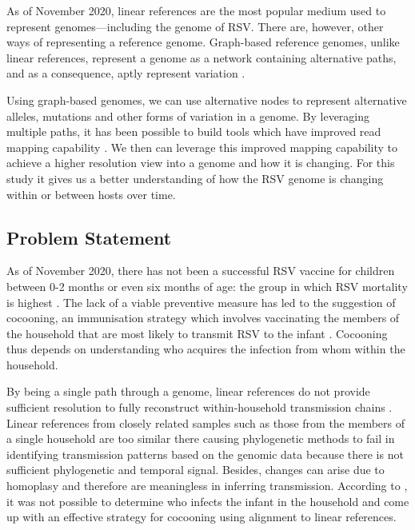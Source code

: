 \documentclass[10pt, a4paper]{article}
\begin{document}
As of November 2020, linear references are the most popular medium used to
represent genomes—including the genome of RSV. There are, however, other ways of
representing a reference genome. Graph-based reference genomes,  unlike linear
references, represent a genome as a network containing alternative paths, and as
a consequence, aptly represent variation \cite{patenGenomeGraphsEvolution2017}.

Using graph-based genomes, we can use alternative nodes to represent alternative
alleles, mutations and other forms of variation in a genome.
By leveraging multiple paths, it has been possible to build tools which have
improved read mapping capability
\cite{garrisonVariationGraphToolkit2018,eizengaSuccinctDynamicVariation2020}.
We then can leverage this improved mapping capability to achieve a higher
resolution view into a genome and how it is changing. For this study it gives us
a better understanding of how the RSV genome is changing within or between hosts
over time.

\subsection{Problem Statement}
\label{sec:orgc1f5445}
As of November 2020, there has not been a successful RSV vaccine for children
between 0-2 months or even six months of age: the group in which RSV mortality
is highest \cite{nokesNewStrategiesControl2008}.
The lack of a viable preventive measure has led to the suggestion of cocooning,
an immunisation strategy which involves vaccinating the members of the household
that are most likely to transmit RSV to the infant
\cite{grizasCocooningConceptProtect2012,urwylerProtectingNewbornsPertussis2014,blainAssessmentCocooningStrategy2016}.
Cocooning thus depends on understanding who acquires the infection from whom
within the household.

By being a single path through a genome, linear references do not provide
sufficient resolution to fully reconstruct within-household transmission chains
\cite{agotiGenomicAnalysisRespiratory2019,githinjiAssessingUtilityMinority2018}.
Linear references from closely related samples such as those from the members of
a single household are too similar there causing phylogenetic methods to fail in
identifying transmission patterns based on the genomic data because there is not
sufficient phylogenetic and temporal signal. Besides, changes can arise due to
homoplasy and therefore are meaningless in inferring transmission.
According to \cite{agotiGenomicAnalysisRespiratory2019}, it was not possible to
determine who infects the infant in the household and come up with an effective
strategy for cocooning using alignment to linear references.
\end{document}
